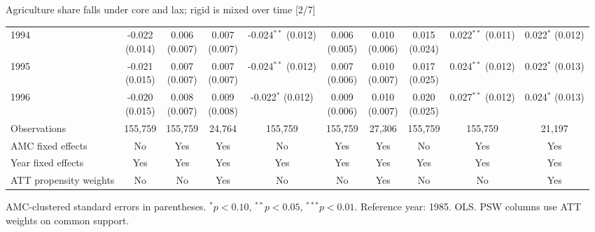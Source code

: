 \documentclass[aspectratio=169]{beamer}
\begin{document}
\begin{frame}{Agriculture share falls under core and lax; rigid is mixed over time [2/7]}
{\begin{tabular}{@{}l*{9}{c}@{}}
1994 & \shortstack{-0.022\\(0.014)} & \shortstack{0.006\\(0.007)} & \shortstack{0.007\\(0.007)} & \shortstack{-0.024$^{**}$\\(0.012)} & \shortstack{0.006\\(0.005)} & \shortstack{0.010\\(0.006)} & \shortstack{0.015\\(0.024)} & \shortstack{0.022$^{**}$\\(0.011)} & \shortstack{0.022$^{*}$\\(0.012)} \\
1995 & \shortstack{-0.021\\(0.015)} & \shortstack{0.007\\(0.007)} & \shortstack{0.007\\(0.007)} & \shortstack{-0.024$^{**}$\\(0.012)} & \shortstack{0.007\\(0.006)} & \shortstack{0.010\\(0.007)} & \shortstack{0.017\\(0.025)} & \shortstack{0.024$^{**}$\\(0.012)} & \shortstack{0.022$^{*}$\\(0.013)} \\
1996 & \shortstack{-0.020\\(0.015)} & \shortstack{0.008\\(0.007)} & \shortstack{0.009\\(0.008)} & \shortstack{-0.022$^{*}$\\(0.012)} & \shortstack{0.009\\(0.006)} & \shortstack{0.010\\(0.007)} & \shortstack{0.020\\(0.025)} & \shortstack{0.027$^{**}$\\(0.012)} & \shortstack{0.024$^{*}$\\(0.013)} \\
\midrule
Observations & 155,759 & 155,759 & 24,764 & 155,759 & 155,759 & 27,306 & 155,759 & 155,759 & 21,197 \\
AMC fixed effects & No & Yes & Yes & No & Yes & Yes & No & Yes & Yes \\
Year fixed effects & Yes & Yes & Yes & Yes & Yes & Yes & Yes & Yes & Yes \\
ATT propensity weights & No & No & Yes & No & No & Yes & No & No & Yes \\
\bottomrule
\end{tabular}%
}
\vspace{0.1em}
{\tiny\color{ZMidGray} AMC-clustered standard errors in parentheses. $^{*}p<0.10$, $^{**}p<0.05$, $^{***}p<0.01$. Reference year: 1985. OLS. PSW columns use ATT weights on common support.}
\end{frame}
\end{document}
